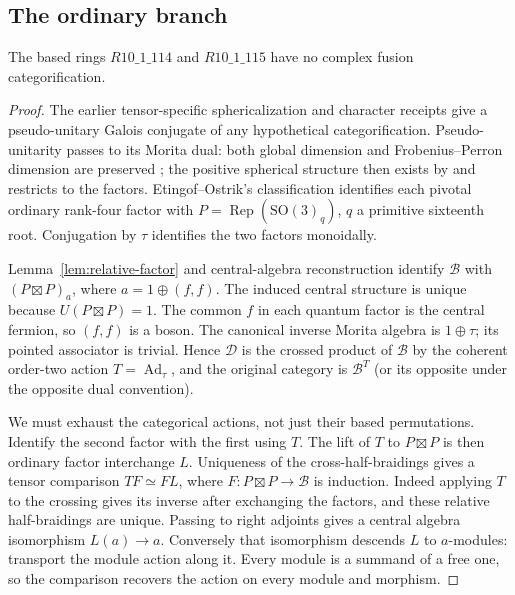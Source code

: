 \subsection{The ordinary branch}
\begin{theorem}
The based rings $R10\_1\_114$ and $R10\_1\_115$ have no complex
fusion categorification.
\end{theorem}
\begin{proof}
The earlier tensor-specific sphericalization and character receipts give
a pseudo-unitary Galois conjugate of any hypothetical categorification.
Pseudo-unitarity passes to its Morita dual: both global dimension and
Frobenius--Perron dimension are preserved
\cite[Theorem~2.15, Corollary~8.14]{ENO}; the positive spherical
structure then exists by \cite[Proposition~8.23]{ENO} and restricts to
the factors. Etingof--Ostrik's classification
\cite[Theorem~A.3]{EOSemisimple} identifies each pivotal ordinary
rank-four factor with $P=\operatorname{Rep}(\mathrm{SO}(3)_q)$,
$q$ a primitive sixteenth root. Conjugation by $\tau$ identifies the
two factors monoidally.

Lemma~\ref{lem:relative-factor} and central-algebra reconstruction
\cite[Corollary~5.6]{BrugNat} identify
$\mathcal B$ with $(P\boxtimes P)_a$, where
$a=1\oplus(f,f)$. The induced central structure is unique because
$U(P\boxtimes P)=1$. The common $f$ in each quantum factor is the
central fermion, so $(f,f)$ is a boson. The canonical inverse Morita
algebra is $1\oplus\tau$; its pointed associator is trivial. Hence
$\mathcal D$ is the crossed product of $\mathcal B$ by the coherent
order-two action $T=\operatorname{Ad}_{\tau}$, and the original
category is $\mathcal B^T$ (or its opposite under the opposite dual
convention).

We must exhaust the categorical actions, not just their based
permutations. Identify the second factor with the first using $T$.
The lift of $T$ to $P\boxtimes P$ is then ordinary factor interchange
$L$. Uniqueness of the cross-half-braidings gives a tensor comparison
$TF\simeq FL$, where $F:P\boxtimes P\to\mathcal B$ is induction.
Indeed applying $T$ to the crossing gives its inverse after exchanging
the factors, and these relative half-braidings are unique. Passing to
right adjoints gives a central algebra isomorphism $L(a)\to a$.
Conversely that isomorphism descends $L$ to $a$-modules: transport the
module action along it. Every module is a summand of a free one, so
the comparison recovers the action on every module and morphism.


\end{proof}
